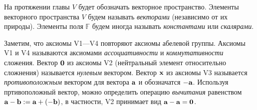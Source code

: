 

На протяжении главы $V$ будет обозначать векторное пространство.
Элементы векторного пространства $V$ будем называть {\it векторами} (независимо от их природы).
Элементы поля $\mathbb{F}$ будем иногда называть {\it константами} или {\it скалярами}.

Заметим, что аксиомы V1---V4 повторяют аксиомы абелевой группы.
Аксиомы V1 и V4 называются аксиомами {\it ассоциативности} и {\it коммутативности} сложения.
Вектор $\mathbf{0}$ из аксиомы V2 (нейтральный элемент относительно сложнения)
 называется {\it нулевым} вектором. 
Вектор $\mathbf{x}$ из аксиомы V3  называется {\it противоположным} 
вектором для вектора $\mathbf{a}$ и обозначатся $-\mathbf{a}$.
Используя пртивоположный вектор, можно определить операцию {\it вычитания} равенством $\mathbf{a}-\mathbf{b}:= \mathbf{a}+(-\mathbf{b})$,
в частности, V2 принимает вид $\mathbf{a}-\mathbf{a}=\mathbf{0}$.



